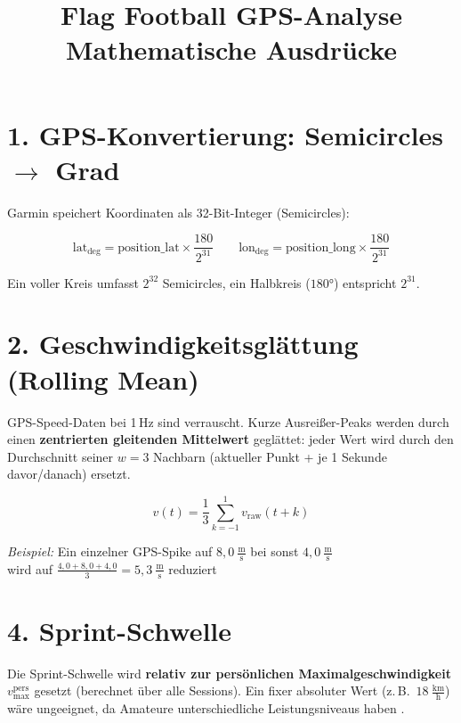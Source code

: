 \documentclass[a4paper, 11pt]{article}
\title{\textbf{Flag Football GPS-Analyse}\\[0.3em]\large Mathematische Ausdrücke}
\author{}
\date{}
\begin{document}
\maketitle

\section*{1. GPS-Konvertierung: Semicircles $\to$ Grad}

Garmin speichert Koordinaten als 32-Bit-Integer (Semicircles):

\[
  \text{lat}_{\deg} = \text{position\_lat}  \times \frac{180}{2^{31}}
  \qquad
  \text{lon}_{\deg} = \text{position\_long} \times \frac{180}{2^{31}}
\]

Ein voller Kreis umfasst $2^{32}$ Semicircles, ein Halbkreis ($180°$) entspricht $2^{31}$.

\section*{2. Geschwindigkeitsglättung (Rolling Mean)}

GPS-Speed-Daten bei 1\,Hz sind verrauscht. Kurze Ausreißer-Peaks werden durch einen
\textbf{zentrierten gleitenden Mittelwert} geglättet: jeder Wert wird durch den
Durchschnitt seiner $w = 3$ Nachbarn (aktueller Punkt + je 1 Sekunde davor/danach) ersetzt.

\[
  \hat{v}(t) = \frac{1}{3} \sum_{k=-1}^{1} v_{\text{raw}}(t + k)
\]

\centering
\textit{Beispiel:} Ein einzelner GPS-Spike auf $8{,}0\ \tfrac{\text{m}}{\text{s}}$
bei sonst $4{,}0\ \tfrac{\text{m}}{\text{s}}$\\ wird auf
$\frac{4{,}0 + 8{,}0 + 4{,}0}{3} = 5{,}3\ \tfrac{\text{m}}{\text{s}}$ reduziert

\section*{4. Sprint-Schwelle}

Die Sprint-Schwelle wird \textbf{relativ zur persönlichen Maximalgeschwindigkeit}
$v_{\max}^{\text{pers}}$ gesetzt (berechnet über alle Sessions). Ein fixer absoluter
Wert (z.\,B.\ $18\ \tfrac{\text{km}}{\text{h}}$) wäre ungeeignet, da Amateure
unterschiedliche Leistungsniveaus haben \cite{sfs_metrics}.
\end{document}
